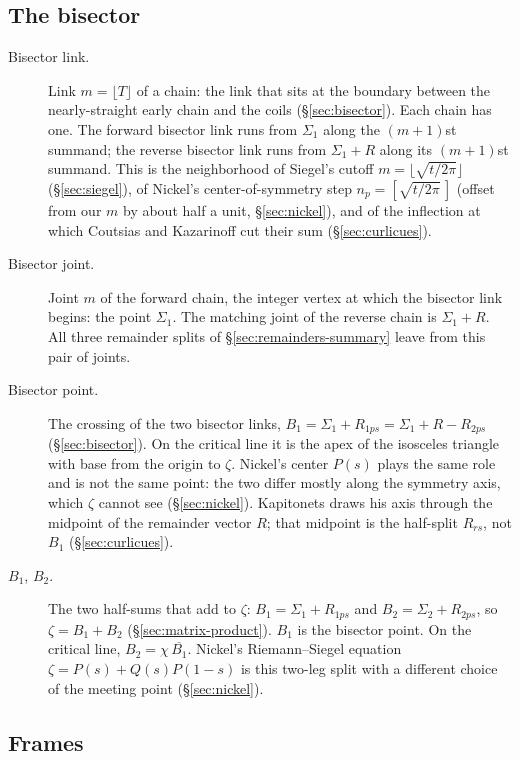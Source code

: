 \documentclass[11pt]{article}
\theoremstyle{definition}
\begin{document}
\subsection*{The bisector}

\begin{description}
\item[Bisector link.]
Link $m=\lfloor T\rfloor$ of a chain: the link that sits at the
boundary between the nearly-straight early chain and the coils
(\S\ref{sec:bisector}).
Each chain has one.
The forward bisector link runs from $\Sigma_1$ along the
$(m+1)$st summand; the reverse bisector link runs from $\Sigma_1+R$
along its $(m+1)$st summand.
This is the neighborhood of Siegel's cutoff
$m=\lfloor\sqrt{t/2\pi}\rfloor$ (\S\ref{sec:siegel}), of Nickel's
center-of-symmetry step $n_p=[\sqrt{t/2\pi}\,]$ (offset from our $m$
by about half a unit, \S\ref{sec:nickel}), and of the inflection at
which Coutsias and Kazarinoff cut their sum
(\S\ref{sec:curlicues}).

\item[Bisector joint.]
Joint $m$ of the forward chain, the integer vertex at which the
bisector link begins: the point $\Sigma_1$.
The matching joint of the reverse chain is $\Sigma_1+R$.
All three remainder splits of \S\ref{sec:remainders-summary} leave
from this pair of joints.

\item[Bisector point.]
The crossing of the two bisector links,
$B_1=\Sigma_1+R_{1ps}=\Sigma_1+R-R_{2ps}$
(\S\ref{sec:bisector}).
On the critical line it is the apex of the isosceles triangle with
base from the origin to $\zeta$.
Nickel's center $P(s)$ plays the same role and is not the same
point: the two differ mostly along the symmetry axis, which $\zeta$
cannot see (\S\ref{sec:nickel}).
Kapitonets draws his axis through the midpoint of the remainder
vector $R$; that midpoint is the half-split $R_{rs}$, not $B_1$
(\S\ref{sec:curlicues}).

\item[$B_1$, $B_2$.]
The two half-sums that add to $\zeta$:
$B_1=\Sigma_1+R_{1ps}$ and $B_2=\Sigma_2+R_{2ps}$, so
$\zeta=B_1+B_2$ (\S\ref{sec:matrix-product}).
$B_1$ is the bisector point.
On the critical line, $B_2=\chi\,\overline{B_1}$.
Nickel's Riemann--Siegel equation $\zeta=P(s)+Q(s)P(1-s)$ is this
two-leg split with a different choice of the meeting point
(\S\ref{sec:nickel}).
\end{description}

\subsection*{Frames}
\end{document}

